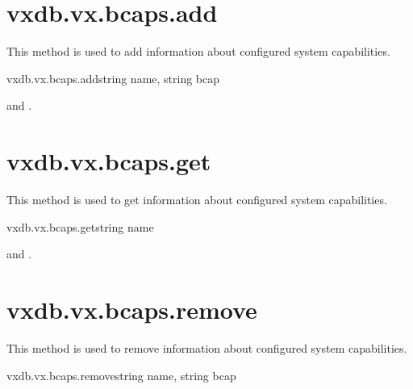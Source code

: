 
\rpcnoerrors


\section{vxdb.vx.bcaps.add}

This method is used to add information about configured system capabilities.

\begin{rpcsynopsis}{vxdb.vx.bcaps.add}{string name, string bcap}
\end{rpcsynopsis}

\begin{rpcaccess}
 and \rpcownerchecks.
\end{rpcaccess}

\rpcreturnnil

\rpcnoerrors


\section{vxdb.vx.bcaps.get}

This method is used to get information about configured system capabilities.

\begin{rpcsynopsis}{vxdb.vx.bcaps.get}{string name}
\end{rpcsynopsis}

\begin{rpcaccess}
 and \rpcownerchecks.
\end{rpcaccess}


\rpcnoerrors


\section{vxdb.vx.bcaps.remove}

This method is used to remove information about configured system capabilities.

\begin{rpcsynopsis}{vxdb.vx.bcaps.remove}{string name, string bcap}
\end{rpcsynopsis}

